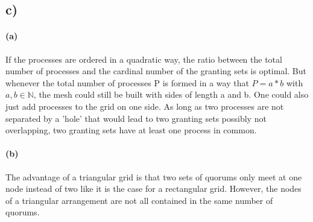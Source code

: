 \documentclass[12pt,a4paper]{article}
\begin{document}
  \subsection*{c)} %
    \paragraph*{(a)} 
    If the processes are ordered in a quadratic way, the ratio between the total number of processes and the cardinal number of the granting sets is optimal. But whenever the total number of processes P is formed in a way that $P=a*b$ with $a,b \in \mathbb{N}$, the mesh could still be built with sides of length a and b. One could also just add processes to the grid on one side. As long as two processes are not separated by a 'hole' that would lead to two granting sets possibly not overlapping, two granting sets have at least one process in common.
    \paragraph*{(b)} %
	The advantage of a triangular grid is that two sets of quorums only meet at one node instead of two like it is the case for a rectangular grid. However, the nodes of a triangular arrangement are not all contained in the same number of quorums.
\end{document}
